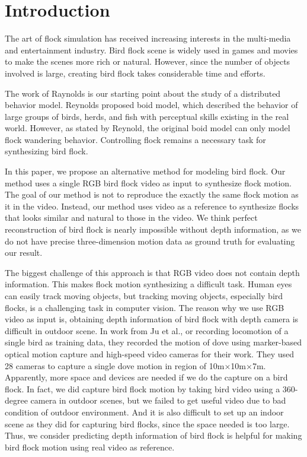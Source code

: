 \chapter{Introduction}


  The art of flock simulation has received increasing interests in the multi-media and entertainment industry. Bird flock scene is widely used in games and movies to make the scenes more rich or natural. However, since the number of objects involved is large, creating bird flock takes considerable time and efforts.


The work of Raynolds \cite{Boid, Steering} is our starting point about the study of a distributed behavior model. Reynolds proposed boid model, which described the behavior of large groups of birds, herds, and fish with perceptual skills existing in the real world. However, as stated by Reynold, the original boid model can only model flock wandering behavior. Controlling flock remains a necessary task for synthesizing bird flock. 


In this paper, we propose an alternative method for modeling bird flock. Our method uses a single RGB bird flock video as input to synthesize flock motion. The goal of our method is not to reproduce the exactly the same flock motion as it in the video. Instead, our method uses video as a reference to synthesize flocks that looks similar and natural to those in the video. We think perfect reconstruction of bird flock is nearly impossible without depth information, as we do not have precise three-dimension motion data as ground truth for evaluating our result.



The biggest challenge of this approach is that RGB video does not contain depth information. This makes flock motion synthesizing a difficult task. Human eyes can easily track moving objects, but tracking moving objects, especially bird flocks, is a challenging task in computer vision. The reason why we use RGB video as input is, obtaining depth information of bird flock with depth camera is difficult in outdoor scene. In work from Ju et al.\cite{Flappy}, or recording locomotion of a single bird as training data, they recorded the motion of dove using marker-based optical motion capture and high-speed video cameras for their work. They used 28 cameras to capture a single dove motion in region of 10m×10m×7m. Apparently, more space and devices are needed if we do the capture on a bird flock. In fact, we did capture bird flock motion by taking bird video using a 360-degree camera in outdoor scenes, but we failed to get useful video due to bad condition of outdoor environment. And it is also difficult to set up an indoor scene as they did for capturing bird flocks, since the space needed is too large. Thus, we consider predicting depth information of bird flock is helpful for making bird flock motion using real video as reference.


